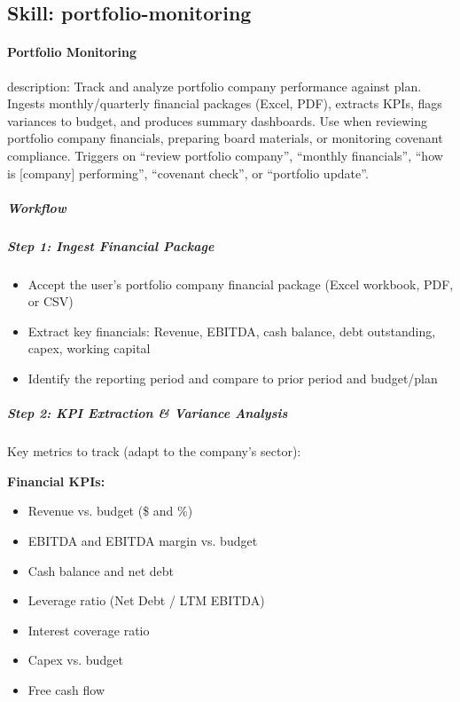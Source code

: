 \documentclass[11pt]{article}
\begin{document}
\subsection{Skill: portfolio-monitoring}\label{file:valuation-reviewer-skills-portfolio-monitoring-SKILL-md}

\paragraph{Portfolio Monitoring}\mbox{}\par

description: Track and analyze portfolio company performance against plan. Ingests monthly/quarterly financial packages (Excel, PDF), extracts KPIs, flags variances to budget, and produces summary dashboards. Use when reviewing portfolio company financials, preparing board materials, or monitoring covenant compliance. Triggers on ``review portfolio company'', ``monthly financials'', ``how is [company] performing'', ``covenant check'', or ``portfolio update''.


\subparagraph{Workflow}\mbox{}\par

\subparagraph{Step 1: Ingest Financial Package}\mbox{}\par

\begin{itemize}[leftmargin=*,itemsep=2pt,topsep=2pt]
\item {} Accept the user's portfolio company financial package (Excel workbook, PDF, or CSV)
\item {} Extract key financials: Revenue, EBITDA, cash balance, debt outstanding, capex, working capital
\item {} Identify the reporting period and compare to prior period and budget/plan
\end{itemize}

\subparagraph{Step 2: KPI Extraction \& Variance Analysis}\mbox{}\par

Key metrics to track (adapt to the company's sector):


\textbf{Financial KPIs:}

\begin{itemize}[leftmargin=*,itemsep=2pt,topsep=2pt]
\item {} Revenue vs. budget (\$ and \%)
\item {} EBITDA and EBITDA margin vs. budget
\item {} Cash balance and net debt
\item {} Leverage ratio (Net Debt / LTM EBITDA)
\item {} Interest coverage ratio
\item {} Capex vs. budget
\item {} Free cash flow
\end{itemize}
\end{document}
